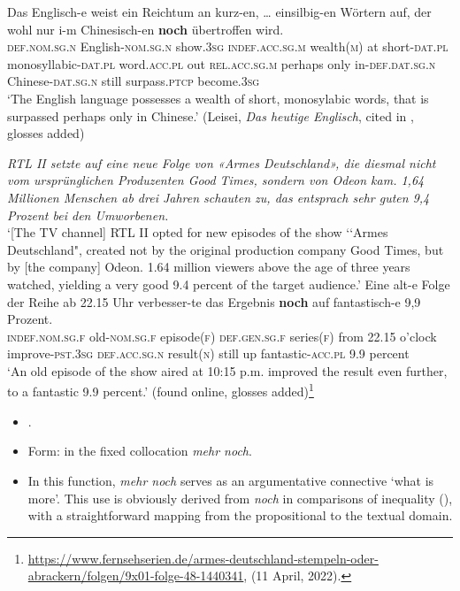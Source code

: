 \begin{exe}
\ex\label{exAppendixGermanComparative4}
	 \gll Das Englisch-e weist ein Reichtum an kurz-en, … einsilbig-en Wörtern auf, der wohl nur i-m Chinesisch-en \textbf{noch} übertroffen wird.\\
	\textsc{def}.\textsc{nom}.\textsc{sg}.\textsc{n} English-\textsc{nom}.\textsc{sg}.\textsc{n} show.3\textsc{sg} \textsc{indef}.\textsc{acc}.\textsc{sg}.\textsc{m} wealth(\textsc{m}) at short-\textsc{dat}.\textsc{pl} {} monosyllabic-\textsc{dat}.\textsc{pl} word.\textsc{acc}.\textsc{pl} out \textsc{rel}.\textsc{acc}.\textsc{sg}.\textsc{m} perhaps only in-\textsc{def}.\textsc{dat}.\textsc{sg}.\textsc{n} Chinese-\textsc{dat}.\textsc{sg}.\textsc{n} still surpass.\textsc{ptcp} become.3\textsc{sg}\\
	\glt \lq The English language possesses a wealth of short, monosylabic words, that is surpassed perhaps only in Chinese.' (Leisei, \textit{Das heutige Englisch}, cited in \cite[62]{Shetter1966}, glosses added)

\ex\label{exAppendixGermanComparative5}
\textit{RTL II setzte auf eine neue Folge von «Armes Deutschland», die diesmal nicht vom ursprünglichen Produzenten Good Times, sondern von Odeon kam. 1,64 Millionen Menschen ab drei Jahren schauten zu, das entsprach sehr guten 9,4 Prozent bei den Umworbenen.}\\
\lq [The TV channel] RTL II opted for new episodes of the show \lq\lq Armes Deutschland", created not by the original production company Good Times, but by [the company] Odeon. 1.64 million viewers above the age of three years watched, yielding a very good 9.4 percent of the target audience.'
\exi{}\gll Eine alt-e Folge der Reihe ab 22.15 Uhr verbesser-te das Ergebnis \textbf{noch} auf fantastisch-e 9,9 Prozent.\\
\textsc{indef}.\textsc{nom}.\textsc{sg}.\textsc{f} old-\textsc{nom}.\textsc{sg}.\textsc{f} episode(\textsc{f}) \textsc{def}.\textsc{gen}.\textsc{sg}.\textsc{f} series(\textsc{f}) from 22.15 o'clock improve-\textsc{pst}.3\textsc{sg} \textsc{def}.\textsc{acc}.\textsc{sg}.\textsc{n} result(\textsc{n}) still up fantastic-\textsc{acc}.\textsc{pl} 9.9 percent\\
\glt \lq{}An old episode of the show aired at 10:15 p.m. improved the result even further, to a fantastic 9.9 percent.' (found online, glosses added)\footnote{\url{https://www.fernsehserien.de/armes-deutschland-stempeln-oder-abrackern/folgen/9x01-folge-48-1440341}, (11 April, 2022).}
\end{exe}

\label{appendixGermanWhatIsMore}
\begin{itemize}
	\item \textcite[631–632]{MetrichFaucher2009}.
	\item Form: in the fixed collocation \textit{mehr noch}.
	\item In this function, \textit{mehr noch} serves as an argumentative connective \lq what is more\rq{}. This use is obviously derived from \textit{noch} in comparisons of inequality (), with a straightforward mapping from the propositional to the textual domain.
\end{itemize}

